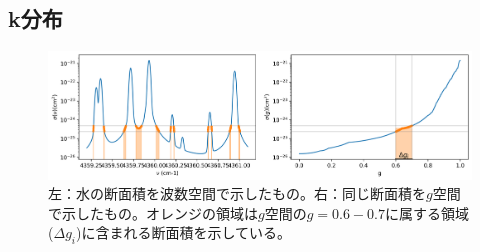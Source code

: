 \subsection*{k分布}

\begin{figure}[b]
    \centering
    \includegraphics[width=1.0\linewidth]{fig/ckd/corrk_test.png}
    \caption{左：水の断面積を波数空間で示したもの。右：同じ断面積を$g$空間で示したもの。オレンジの領域は$g$空間の$g=0.6-0.7$に属する領域($\Delta g_i$)に含まれる断面積を示している。}
    \label{fig:ckd_fig1}
\end{figure}


